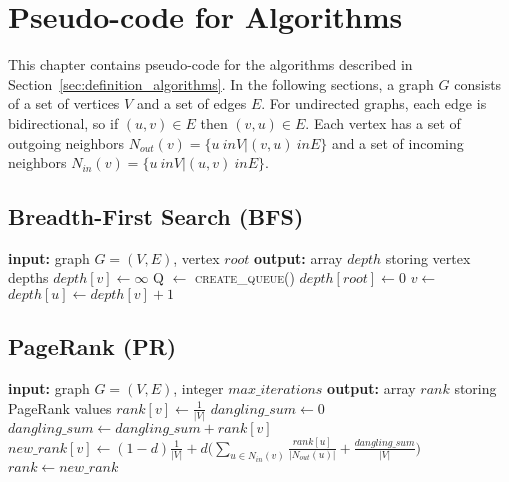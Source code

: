 \chapter{Pseudo-code for Algorithms}
\label{chap:algorithms}
This chapter contains pseudo-code for the algorithms described in Section~\ref{sec:definition_algorithms}. In the following sections, a graph $G$ consists of a set of vertices $V$ and a set of edges $E$. For undirected graphs, each edge is bidirectional, so if $(u, v) \in E$ then $(v, u) \in E$. Each vertex has a set of outgoing neighbors $N_{out}(v) = \{u \ in V | (v, u) \ in E\}$ and a set of incoming neighbors $N_{in}(v) = \{u \ in V | (u, v) \ in E\}$.

\section{Breadth-First Search (BFS)}

\begin{algorithm}[h!]
\begin{algorithmic}[1]
\Statex \textbf{input:} graph $G=(V,E)$, vertex $root$
\Statex \textbf{output:} array $depth$ storing vertex depths
  \State $depth[v] \gets \infty$  
\EndFor
\State Q $\gets$  \textsc{create\_queue()}
\State {}
\State $depth[root] \gets 0$
  \State $v \gets $ 
      \State $depth[u] \gets depth[v] + 1$
      \State {}
    \EndIf
  \EndFor
\EndWhile
\end{algorithmic}
\end{algorithm}

\section{PageRank (PR)}

\begin{algorithm}[h!]
\begin{algorithmic}[1]
\Statex \textbf{input:} graph $G=(V,E)$, integer $max\_iterations$
\Statex \textbf{output:} array $rank$ storing PageRank values
  \State $rank[v] \gets \frac{1}{|V|}$  
\EndFor
{}
\State $dangling\_sum \gets 0$
    \State $dangling\_sum \gets dangling\_sum + rank[v]$
  \EndIf
\EndFor
{}
  \State $new\_rank[v] \gets (1-d)\frac{1}{|V|} + d \Big( \sum_{u \in N_{in}(v)} \frac{rank[u]}{|N_{out}(u)|} +  \frac{dangling\_sum}{|V|} \Big)$
\EndFor
\State $rank \gets new\_rank$
\EndFor
\end{algorithmic}
\end{algorithm}

